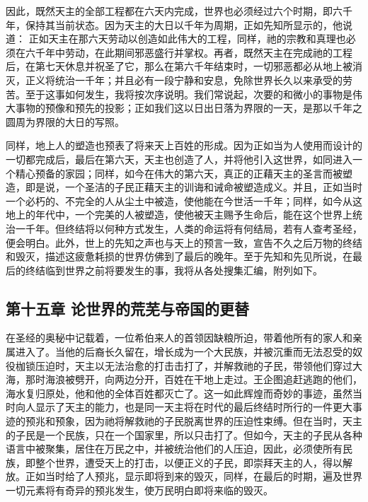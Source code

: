 因此，既然天主的全部工程都在六天内完成，世界也必须经过六个时期，即六千年，保持其当前状态。因为天主的大日以千年为周期，正如先知所显示的，他说道： 正如天主在那六天劳动以创造如此伟大的工程，同样，祂的宗教和真理也必须在六千年中劳动，在此期间邪恶盛行并掌权。再者，既然天主在完成祂的工程后，在第七天休息并祝圣了它，那么在第六千年结束时，一切邪恶都必从地上被消灭，正义将统治一千年；并且必有一段宁静和安息，免除世界长久以来承受的劳苦。至于这事如何发生，我将按次序说明。我们常说起，次要的和微小的事物是伟大事物的预像和预先的投影；正如我们这以日出日落为界限的一天，是那以千年之圆周为界限的大日的写照。\par

同样，地上人的塑造也预表了将来天上百姓的形成。因为正如当为人使用而设计的一切都完成后，最后在第六天，天主也创造了人，并将他引入这世界，如同进入一个精心预备的家园；同样，如今在伟大的第六天，真正的正藉天主的圣言而被塑造，即是说，一个圣洁的子民正藉天主的训诲和诫命被塑造成义。并且，正如当时一个必朽的、不完全的人从尘土中被造，使他能在今世活一千年；同样，如今从这地上的年代中，一个完美的人被塑造，使他被天主赐予生命后，能在这个世界上统治一千年。但终结将以何种方式发生，人类的命运将有何结局，若有人查考圣经，便会明白。此外，世上的先知之声也与天上的预言一致，宣告不久之后万物的终结和毁灭，描述这疲惫耗损的世界仿佛到了最后的晚年。至于先知和先见所说，在最后的终结临到世界之前将要发生的事，我将从各处搜集汇编，附列如下。\par


\subsection{第十五章 论世界的荒芜与帝国的更替}

在圣经的奥秘中记载着，一位希伯来人的首领因缺粮所迫，带着他所有的家人和亲属进入了。当他的后裔长久留在，增长成为一个大民族，并被沉重而无法忍受的奴役枷锁压迫时，天主以无法治愈的打击击打了，并解救祂的子民，带领他们穿过大海，那时海浪被劈开，向两边分开，百姓在干地上走过。王企图追赶逃跑的他们，海水复归原处，他和他的全体百姓都灭亡了。这一如此辉煌而奇妙的事迹，虽然当时向人显示了天主的能力，也是同一天主将在时代的最后终结时所行的一件更大事迹的预兆和预象，因为祂将解救祂的子民脱离世界的压迫性束缚。但在当时，天主的子民是一个民族，只在一个国家里，所以只击打了。但如今，天主的子民从各种语言中被聚集，居住在万民之中，并被统治他们的人压迫，因此，必须使所有民族，即整个世界，遭受天上的打击，以便正义的子民，即崇拜天主的人，得以解放。正如当时给了人预兆，显示即将到来的毁灭，同样，在最后的时期，遍及世界一切元素将有奇异的预兆发生，使万民明白即将来临的毁灭。\par

